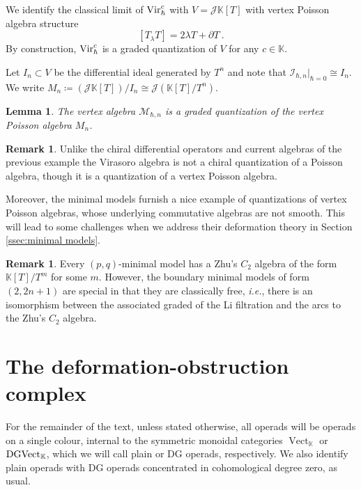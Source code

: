 \documentclass[11pt]{amsart}
\numberwithin{equation}{section}
\newtheorem{lemma}[theo]{Lemma}
\theoremstyle{definition}
\newtheorem{rmk}[theo]{Remark}
\newcommand{\bb}{\mathbb}
\newcommand{\mc}{\mathcal}
\DeclareMathOperator{\Vect}{Vect}
\newcommand{\K}{{\bb K}}
\newcommand{\ik}{{\bb K}}
\newcommand{\Vir}{{\textup{Vir}}}
\newcommand{\0}{{\textbf{0}}}
\newcommand{\MM}{{\textbf{M}}}
\newcommand{\DGVect}{\textup{DGVect}}
\def\II{{\mc I}}
\def\JJ{{\mc J}}
\def\MM{{\mc M}}
\def \ie{{\it i.e.}}
\begin{document}
We identify the classical limit of $\Vir^c_{\hbar}$ with $V=\JJ\ik[T]$ with vertex Poisson algebra structure
\[
[T_\lambda T] = 2\lambda T +\partial T~.
\]
By construction, $\Vir^c_{\hbar}$ is a graded quantization of $V$ for any $c\in \ik$.

Let $I_n\subset V$ be the differential ideal generated by $T^n$ and note that $\II_{\hbar,n}|_{\hbar=0}\cong I_n$. We write $M_n \coloneqq (\JJ \ik[T])/I_n \cong \JJ(\ik[T]/T^n)$. 

\begin{lemma}
	The vertex algebra $\MM_{\hbar,n}$ is a graded quantization of the vertex Poisson algebra $M_n$.
\end{lemma}


\begin{rmk}
	Unlike the chiral differential operators and current algebras of the previous example the Virasoro algebra is not a chiral quantization of a Poisson algebra, though it is a quantization of a vertex Poisson algebra.

	Moreover, the minimal models furnish a nice example of quantizations of vertex Poisson algebras, whose underlying commutative algebras are not smooth. This will lead to some challenges when we address their deformation theory in Section \ref{ssec:minimal models}.
\end{rmk}

\begin{rmk}
Every $(p,q)$-minimal model has a Zhu's $C_2$ algebra of the form $\ik[T]/T^m$ for some $m$. However, the boundary minimal models of form $(2,2n+1)$ are special in that they are classically free, \ie, there is an isomorphism between the associated graded of the Li filtration and the arcs to the Zhu's $C_2$ algebra.
\end{rmk}








\section{The deformation-obstruction complex}\label{defsec}


For the remainder of the text, unless stated otherwise, all operads will be operads on a single colour, internal to the symmetric monoidal categories $\Vect_\K$ or $\DGVect_\K$, which we will call plain or DG operads, respectively. We also identify plain operads with DG operads concentrated in cohomological degree zero, as usual.
\end{document}
